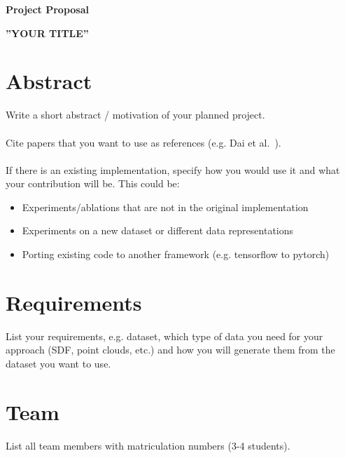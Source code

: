 \documentclass[a4paper,pagesize 10pt]{scrartcl}
\begin{document}
\begin{center}{\Huge\textbf{Project Proposal}}\end{center}
\begin{center}{\Large\textbf{''YOUR TITLE''}}\end{center}

\section{Abstract}

Write a short abstract / motivation of your planned project.\\\\
Cite papers that you want to use as references (e.g. Dai et al.~\cite{dai2017shape}).\\\\
If there is an existing implementation, specify how you would use it and what your contribution will be.
This could be: 
\begin{itemize}
\itemsep0em
	\item Experiments/ablations that are not in the original implementation
	\item Experiments on a new dataset or different data representations
	\item Porting existing code to another framework (e.g. tensorflow to pytorch)
\end{itemize}


\section{Requirements}
List your requirements, e.g. dataset, which type of data you need for your approach (SDF, point clouds, etc.) and how you will generate them from the dataset you want to use.


\section{Team}
List all team members with matriculation numbers (3-4 students).


{\small
	
	
}
\end{document}
